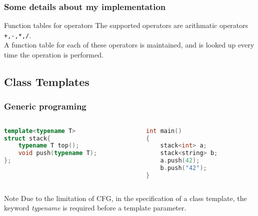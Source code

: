 \documentclass{beamer}
\begin{document}
\begin{frame}
    \frametitle{Some details about my implementation}

    \begin{block}{Function tables for operators}
        The supported operators are arithmatic operators \lstinline{+,-,*,/}. \\
        A function table for each of these operators is maintained, and is looked up every time the operation is performed.
    \end{block}


\end{frame}
\subsection{Class Templates}

\begin{frame}[fragile]
    \frametitle{Generic programing}

    \begin{example}
        \footnotesize
        \begin{columns}
            \begin{column}[]{0.4\textwidth}
                \begin{lstlisting}[language=C++]
template<typename T>
struct stack{
    typename T top();
    void push(typename T);
};
                \end{lstlisting}

            \end{column}

            \begin{column}[]{0.4\textwidth}
                \begin{lstlisting}[language=C]
int main()
{
    stack<int> a;
    stack<string> b;
    a.push(42);
    b.push("42");
}
                \end{lstlisting}
            \end{column}
        \end{columns}
    \end{example}

    \begin{block}{Note}
        \small
        Due to the limitation of CFG, in the specification of a class template, the keyword \textit{typename} is required before a template parameter.
    \end{block}
\end{frame}
\end{document}
